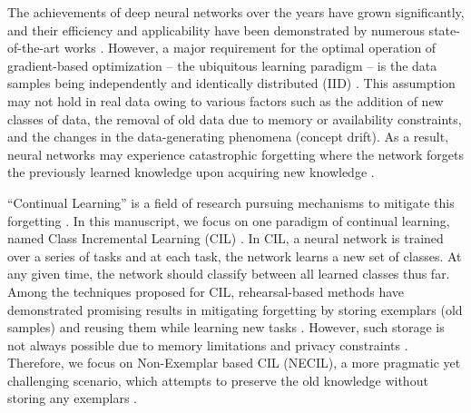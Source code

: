 \documentclass[10pt,twocolumn,letterpaper]{article}
\begin{document}
The achievements of deep neural networks over the years have grown significantly, and their efficiency and applicability have been demonstrated by numerous state-of-the-art works \cite{Krizhevsky2012ImageNetNetworks, He2016DeepRecognition, Long2015FullySegmentation, Girshick2015FastR-CNN}. However, a major requirement for the optimal operation of gradient-based optimization -- the ubiquitous learning paradigm -- is the data samples being independently and identically distributed (IID) \cite{Hadsell2020EmbracingNetworks}. This assumption may not hold in real data owing to various factors such as the addition of new classes of data, the removal of old data due to memory or availability constraints, and the changes in the data-generating phenomena (concept drift). As a result, neural networks may experience catastrophic forgetting where the network forgets the previously learned knowledge upon acquiring new knowledge \cite{Kirkpatrick2017OvercomingNetworks}. 

``Continual Learning'' is a field of research pursuing mechanisms to mitigate this forgetting \cite{DeLange2021ATasks}. In this manuscript, we focus on one paradigm of continual learning, named Class Incremental Learning (CIL) \cite{Lampert2017}. In CIL, a neural network is trained over a series of tasks and at each task, the network learns a new set of classes. At any given time, the network should classify between all learned classes thus far. Among the techniques proposed for CIL, rehearsal-based methods have demonstrated promising results in mitigating forgetting by storing exemplars (old samples) and reusing them while learning new tasks \cite{Lampert2017, Castro2018End-to-endLearning,NIPS2017_f8752278}. However, such storage is not always possible due to memory limitations and privacy constraints \cite{Smith2022ALearning}. Therefore, we focus on Non-Exemplar based CIL (NECIL), a more pragmatic yet challenging scenario, which attempts to preserve the old knowledge without storing any exemplars \cite{Zhu2021PrototypeLearning, Zhu2022Self-SustainingLearning}. 
\end{document}
